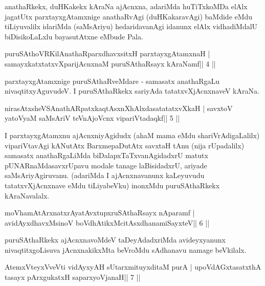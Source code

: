 \begin{artha}
anathaRkekx, duHKakekx kAraNa ajAcnxna, adariMda huTiTxkoMDa elAlx jagatUtx parxtayxgAtamxnige anathaRvAgi (duHKakaravAgi) baMdide eMdu tiLiyuvalilx idariMda (saMsAriyu) hedaridavanAgi idanunx elAlx vidhadiMdalU biDisikoLaLxlu bayasutAtxne eMbude Pala.
\end{artha}

\begin{shl}
puruSAthoVR\s KilAnathaRparxdhavxsitxH parxtayxgAtamxnaH |
samayxkatxtatxvXparijAcnxnaM puruSAthaRsayx kAraNamf\hfill || 4 ||
\end{shl}

\begin{artha}
parxtayxgAtamxnige puruSAthaRveMdare - samasatx anathaRgaLu  nivaqtitxyAguvudeV. I puruSAthaRkekx sariyAda tatatxvXjAcnxnaveV kAraNa.
\end{artha}


\begin{shl}
nirasAtxsheVSAnathARpatxkaqtAsxnXhAlxdasatatatxvXkaH |
savxtoV yatoV\s yaM saMsAriV teVnAjoVcnx vipariVtadaqkf\hfill || 5 ||
\end{shl}

\begin{artha}
I parxtayxgAtamxnu ajAcnxniyAgidudx (ahaM mama eMdu shariVrAdigaLalilx) 
vipariVtavAgi kANutAtx BarxmepaDutAtx savxtaH tAnu (nija rUpadalilx) samasatx anathaRgaLiMda biDalapxTaTxvanAgidadxrU matutx pUNARnaMdasavxrUpavu modale tanage laBisidadxrU, ariyade saMsAriyAgiruvanu. (adariMda I ajAcnxnavanunx kaLeyuvudu tatatxvXjAcnxnave eMdu tiLiyabeVku) inonxMdu puruSAthaRkekx kAraNavalalx.  \mdash 
\end{artha}

\begin{shl}
moVhamAtArxnatxrAyatAvxtupxruSAthaRsayx nAparamf |
avidAyxdhavxMsinoV boVdhAtikxMcitAsxdhanamiSayxteV\hfill || 6 ||
\end{shl}

\begin{artha}
puruSAthaRkekx ajAcnxnavoMdeV taDeyAdadxriMda avideyxyanunx nivaqtitxgoLisuva jAcnxnakikxMta beVroMdu sAdhanavu namage beVkilalx.
\end{artha}


\begin{shl}
AtemxVteyxVveVti vidAyxyAH sUtarxmituyxditaM purA |
upoVdAGxtasatxthA tasayx pArxgukatxH saparxyoVjanaH\hfill || 7 ||
\end{shl}


